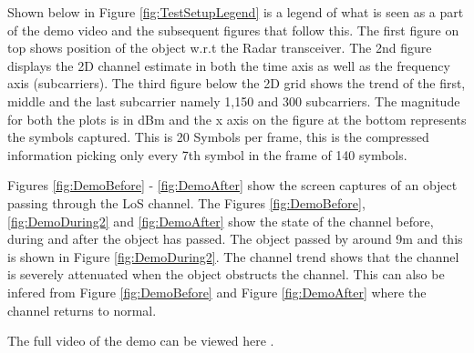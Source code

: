 Shown below in Figure \ref{fig:TestSetupLegend} is a legend of what is seen as a part of the demo video and the subsequent figures that follow this. The first figure on top shows position of the object w.r.t the Radar transceiver. The 2nd figure displays the 2D channel estimate in both the time axis as well as the frequency axis (subcarriers). The third figure below the 2D grid shows the trend of the first, middle and the last subcarrier namely 1,150 and 300 subcarriers. The magnitude for both the plots is in dBm and the x axis on the figure at the bottom represents the symbols captured. This is 20 Symbols per frame, this is the compressed information picking only every 7th symbol in the frame of 140 symbols.

Figures \ref{fig:DemoBefore} - \ref{fig:DemoAfter} show the screen captures of an object passing through the LoS channel. The Figures \ref{fig:DemoBefore}, \ref{fig:DemoDuring2} and \ref{fig:DemoAfter} show the state of the channel before, during and after the object has passed. The object passed by around 9m and this is shown in Figure \ref{fig:DemoDuring2}. The channel trend shows that the channel is severely attenuated when the object obstructs the channel. This can also be infered from Figure \ref{fig:DemoBefore} and Figure \ref{fig:DemoAfter} where the channel returns to normal.

The full video of the demo can be viewed here \cite{demoVideo}.
